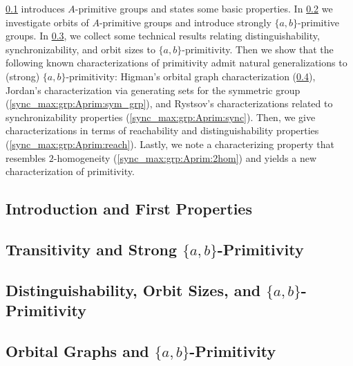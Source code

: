 
\cref{sycn_max:grp:Aprim:sec:intro} introduces $A$-primitive groups and states some basic properties.
In \cref{syncmax:sec:trans-abprim} we investigate orbits of $A$-primitive groups and introduce strongly $\{a,b\}$-primitive
groups. In \cref{sync_max:grp:Aprim:distinguishability}, we collect some technical results
relating distinguishability, synchronizability, and orbit sizes to $\{a,b\}$-primitivity.
Then we show that the following known
characterizations of primitivity
admit natural generalizations to (strong) $\{a,b\}$-primitivity: Higman's orbital graph characterization (\cref{sync_max:grp:Aprim:orbital}),
Jordan's characterization via generating sets for the symmetric group (\cref{sync_max:grp:Aprim:sym_grp}),
and Rystsov's characterizations related to synchronizability properties (\cref{sync_max:grp:Aprim:sync}).
Then, we give characterizations in terms of reachability
and distinguishability properties  (\cref{sync_max:grp:Aprim:reach}).
Lastly, we note a characterizing property that resembles
$2$-homogeneity (\cref{sync_max:grp:Aprim:2hom})
and yields a new characterization of primitivity.

\subsection{Introduction and First Properties}
\label{sycn_max:grp:Aprim:sec:intro}



\subsection{Transitivity and Strong \texorpdfstring{$\{a,b\}$}{\{a,b\}}-Primitivity}
\label{syncmax:sec:trans-abprim}



\subsection{Distinguishability, Orbit Sizes, and \texorpdfstring{$\{a,b\}$}{\{a,b\}}-Primitivity}
\label{sync_max:grp:Aprim:distinguishability}



\subsection{Orbital Graphs and \texorpdfstring{$\{a,b\}$}{\{a,b\}}-Primitivity}
\label{sync_max:grp:Aprim:orbital}

